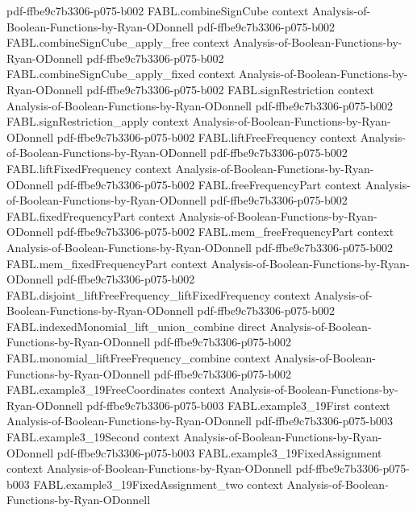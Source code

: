 \begin{theorem}
  {pdf-ffbe9c7b3306-p075-b002}
\proofstep
  {FABL.combineSignCube}
  {context}
  {Analysis-of-Boolean-Functions-by-Ryan-ODonnell}
  {pdf-ffbe9c7b3306-p075-b002}
\proofstep
  {FABL.combineSignCube_apply_free}
  {context}
  {Analysis-of-Boolean-Functions-by-Ryan-ODonnell}
  {pdf-ffbe9c7b3306-p075-b002}
\proofstep
  {FABL.combineSignCube_apply_fixed}
  {context}
  {Analysis-of-Boolean-Functions-by-Ryan-ODonnell}
  {pdf-ffbe9c7b3306-p075-b002}
\proofstep
  {FABL.signRestriction}
  {context}
  {Analysis-of-Boolean-Functions-by-Ryan-ODonnell}
  {pdf-ffbe9c7b3306-p075-b002}
\proofstep
  {FABL.signRestriction_apply}
  {context}
  {Analysis-of-Boolean-Functions-by-Ryan-ODonnell}
  {pdf-ffbe9c7b3306-p075-b002}
\proofstep
  {FABL.liftFreeFrequency}
  {context}
  {Analysis-of-Boolean-Functions-by-Ryan-ODonnell}
  {pdf-ffbe9c7b3306-p075-b002}
\proofstep
  {FABL.liftFixedFrequency}
  {context}
  {Analysis-of-Boolean-Functions-by-Ryan-ODonnell}
  {pdf-ffbe9c7b3306-p075-b002}
\proofstep
  {FABL.freeFrequencyPart}
  {context}
  {Analysis-of-Boolean-Functions-by-Ryan-ODonnell}
  {pdf-ffbe9c7b3306-p075-b002}
\proofstep
  {FABL.fixedFrequencyPart}
  {context}
  {Analysis-of-Boolean-Functions-by-Ryan-ODonnell}
  {pdf-ffbe9c7b3306-p075-b002}
\proofstep
  {FABL.mem_freeFrequencyPart}
  {context}
  {Analysis-of-Boolean-Functions-by-Ryan-ODonnell}
  {pdf-ffbe9c7b3306-p075-b002}
\proofstep
  {FABL.mem_fixedFrequencyPart}
  {context}
  {Analysis-of-Boolean-Functions-by-Ryan-ODonnell}
  {pdf-ffbe9c7b3306-p075-b002}
\proofstep
  {FABL.disjoint_liftFreeFrequency_liftFixedFrequency}
  {context}
  {Analysis-of-Boolean-Functions-by-Ryan-ODonnell}
  {pdf-ffbe9c7b3306-p075-b002}
\proofstep
  {FABL.indexedMonomial_lift_union_combine}
  {direct}
  {Analysis-of-Boolean-Functions-by-Ryan-ODonnell}
  {pdf-ffbe9c7b3306-p075-b002}
\proofstep
  {FABL.monomial_liftFreeFrequency_combine}
  {context}
  {Analysis-of-Boolean-Functions-by-Ryan-ODonnell}
  {pdf-ffbe9c7b3306-p075-b002}
\proofstep
  {FABL.example3_19FreeCoordinates}
  {context}
  {Analysis-of-Boolean-Functions-by-Ryan-ODonnell}
  {pdf-ffbe9c7b3306-p075-b003}
\proofstep
  {FABL.example3_19First}
  {context}
  {Analysis-of-Boolean-Functions-by-Ryan-ODonnell}
  {pdf-ffbe9c7b3306-p075-b003}
\proofstep
  {FABL.example3_19Second}
  {context}
  {Analysis-of-Boolean-Functions-by-Ryan-ODonnell}
  {pdf-ffbe9c7b3306-p075-b003}
\proofstep
  {FABL.example3_19FixedAssignment}
  {context}
  {Analysis-of-Boolean-Functions-by-Ryan-ODonnell}
  {pdf-ffbe9c7b3306-p075-b003}
\proofstep
  {FABL.example3_19FixedAssignment_two}
  {context}
  {Analysis-of-Boolean-Functions-by-Ryan-ODonnell}

\end{theorem}
